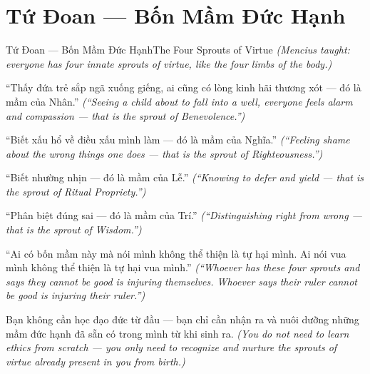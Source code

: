 \section{Tứ Đoan — Bốn Mầm Đức Hạnh}
\begin{truyen}{Tứ Đoan — Bốn Mầm Đức Hạnh}{The Four Sprouts of Virtue}
\textit{(Mencius taught: everyone has four innate sprouts of virtue, like the four limbs of the body.)}

``Thấy đứa trẻ sắp ngã xuống giếng, ai cũng có lòng kinh hãi thương xót — đó là mầm của Nhân.''
\textit{(``Seeing a child about to fall into a well, everyone feels alarm and compassion — that is the sprout of Benevolence.'')}

``Biết xấu hổ về điều xấu mình làm — đó là mầm của Nghĩa.''
\textit{(``Feeling shame about the wrong things one does — that is the sprout of Righteousness.'')}

``Biết nhường nhịn — đó là mầm của Lễ.''
\textit{(``Knowing to defer and yield — that is the sprout of Ritual Propriety.'')}

``Phân biệt đúng sai — đó là mầm của Trí.''
\textit{(``Distinguishing right from wrong — that is the sprout of Wisdom.'')}

``Ai có bốn mầm này mà nói mình không thể thiện là tự hại mình. Ai nói vua mình không thể thiện là tự hại vua mình.''
\textit{(``Whoever has these four sprouts and says they cannot be good is injuring themselves. Whoever says their ruler cannot be good is injuring their ruler.'')}

\end{truyen}

\begin{baihoc}
Bạn không cần học đạo đức từ đầu — bạn chỉ cần nhận ra và nuôi dưỡng những mầm đức hạnh đã sẵn có trong mình từ khi sinh ra.
\textit{(You do not need to learn ethics from scratch — you only need to recognize and nurture the sprouts of virtue already present in you from birth.)}
\end{baihoc}
\ngancach

